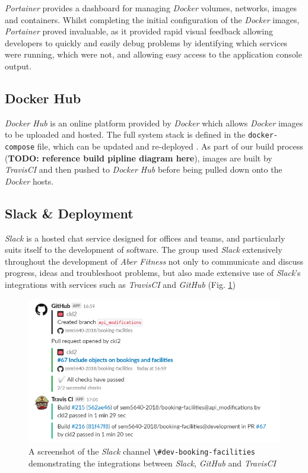 \textit{Portainer} provides a dashboard for managing \textit{Docker} volumes, networks, images and containers. Whilst completing the initial configuration of the \textit{Docker} images, \textit{Portainer} proved invaluable, as it provided rapid visual feedback allowing developers to quickly and easily debug problems by identifying which services were running, which were not, and allowing easy access to the application console output.

\subsection{Docker Hub}
\textit{Docker Hub} is an online platform provided by \textit{Docker} which allows \textit{Docker} images to be uploaded and hosted. The  full system stack is defined in the \lstinline{docker-compose} file, which can be updated and re-deployed . As part of our build process (\textbf{TODO: reference build pipline diagram here}), images are built by \textit{TravisCI} and then pushed to \textit{Docker Hub} before being pulled down onto the \textit{Docker} hosts.


\subsection{Slack \& Deployment}
\textit{Slack} is a hosted chat service designed for offices and teams, and particularly suits itself to the development of software. The group used \textit{Slack} extensively throughout the development of \textit{Aber Fitness} not only to communicate and discuss progress, ideas and troubleshoot problems, but also made extensive use of \textit{Slack}'s integrations with services such as \textit{TravisCI} and \textit{GitHub} (Fig. \ref{fig:slack_travis_github})

\begin{figure}[H]
    \centering
    \includegraphics[width=\textwidth]{Images/Slack_Travis_GitHub.png}
    \caption{A screenshot of the \textit{Slack} channel \lstinline{\#dev-booking-facilities} demonstrating the integrations between \textit{Slack}, \textit{GitHub} and \textit{TravisCI}}
    \label{fig:slack_travis_github}
\end{figure}

